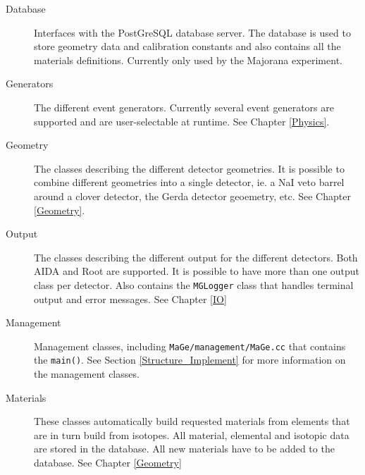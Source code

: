 \noindent
\begin{description}
\item[{Database}] 

             Interfaces with the PostGreSQL database server.
            The database is used to store geometry data and calibration 
            constants and also contains all the materials definitions.
	    Currently only used by the Majorana experiment.
 


\item[{Generators}] 

             The different event generators. Currently several event
	    generators are supported and are user-{}selectable at runtime. See
 Chapter \ref{Physics}.
 


\item[{Geometry}] 

             The classes describing the different detector geometries. 
            It is possible to combine different geometries into a single 
            detector, ie. a NaI veto barrel around a clover detector, the
	    Gerda detector geoemetry, etc. 
            See Chapter \ref{Geometry}.
 


\item[{Output}] 

          The classes describing the different output for the 
         different detectors. Both AIDA and Root are supported. 
	 It is possible to have more than one output class
         per detector. 
	 Also contains the \nolinkurl{MGLogger} class 
         that handles terminal
         output and error messages. See Chapter \ref{IO}  


\item[{Management}] 

 	   Management classes, including 
 \nolinkurl{MaGe/management/MaGe.cc} that contains the 
 \texttt{m\-a\-i\-n\-(\-)}. See 
 Section \ref{Structure_Implement} for more information on the 
           management 
           classes.
 


\item[{Materials}] 

            These classes automatically build requested materials from elements
           that are in turn build from isotopes. All material, elemental and
           isotopic data are stored in the database. All new materials
           have to be added to the database. See Chapter \ref{Geometry}  



\end{description}
